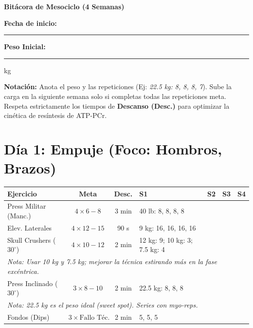\documentclass[10pt, a4paper]{article}
\begin{document}
\begin{center}
    {\Huge \textbf{Bitácora de Mesociclo (4 Semanas)}} \\
    \vspace{0.3cm}
    {\large \textbf{Fecha de inicio:} \rule{4cm}{0.4pt} \hspace{1cm} \textbf{Peso Inicial:} \rule{2cm}{0.4pt} kg}
\end{center}

\noindent \textbf{Notación:} Anota el peso y las repeticiones (Ej: \textit{22.5 kg: 8, 8, 8, 7}). Sube la carga en la siguiente semana solo si completas todas las repeticiones meta. Respeta estrictamente los tiempos de \textbf{Descanso (Desc.)} para optimizar la cinética de resíntesis de ATP-PCr.

\vspace{0.2cm}

\section*{Día 1: Empuje (Foco: Hombros, Brazos)}
\begin{tabularx}{\textwidth}{|l|c|c|X|X|X|X|}
\hline
\rowcolor{gray!20}
\textbf{Ejercicio} & \textbf{Meta} & \textbf{Desc.} & \textbf{S1} & \textbf{S2} & \textbf{S3} & \textbf{S4} \\ \hline
Press Militar (Manc.) & $4 \times 6-8$ & 3 min & 40 lb: 8, 8, 8, 8 & & & \\ \hline
Elev. Laterales & $4 \times 12-15$ & 90 s & 9 kg: 16, 16, 16, 16 & & & \\ \hline
Skull Crushers ($30^\circ$) & $4 \times 10-12$ & 2 min & 12 kg: 9; 10 kg: 3; 7.5 kg: 4 & & & \\ \hline
\multicolumn{7}{|l|}{\scriptsize \textit{Nota: Usar 10 kg y 7.5 kg; mejorar la técnica estirando más en la fase excéntrica.}} \\ \hline
Press Inclinado ($30^\circ$)& $3 \times 8-10$ & 2 min & 22.5 kg: 8, 8, 8 & & & \\ \hline
\multicolumn{7}{|l|}{\scriptsize \textit{Nota: 22.5 kg es el peso ideal (sweet spot). Series con myo-reps.}} \\ \hline
Fondos (Dips) & $3 \times \text{Fallo Téc.}$ & 2 min & 5, 5, 5 & & & \\ \hline
\end{tabularx}

\vspace{0.3cm}

\end{document}
